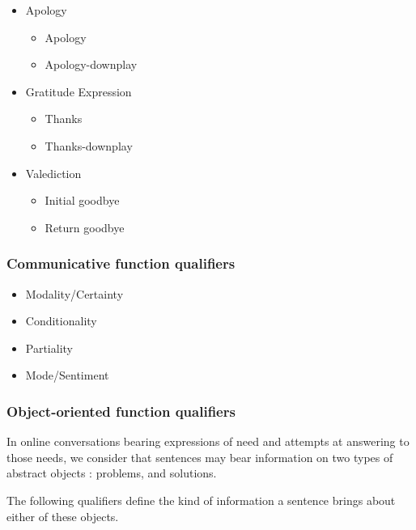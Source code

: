 \begin{itemize}
\begin{itemize}
			\item Apology
				\begin{itemize}
					\item Apology
					\item Apology-downplay
				\end{itemize}
			\item Gratitude Expression
				\begin{itemize}
					\item Thanks
					\item Thanks-downplay
				\end{itemize}
			\item Valediction
				\begin{itemize}
					\item Initial goodbye
					\item Return goodbye
				\end{itemize}
		\end{itemize}
\end{itemize}

\subsubsection{Communicative function qualifiers}
\label{subsubsec:communicative_function_qualifiers}

\begin{itemize}
	\item Modality/Certainty
	\item Conditionality
	\item Partiality
	\item Mode/Sentiment
\end{itemize}

\subsubsection{Object-oriented function qualifiers}
\label{subsubsec:communicative_function_qualifiers}

In online conversations bearing expressions of need and attempts at answering to those needs, we consider that sentences may bear information on two types of abstract objects : problems, and solutions.

The following qualifiers define the kind of information a sentence brings about either of these objects.

